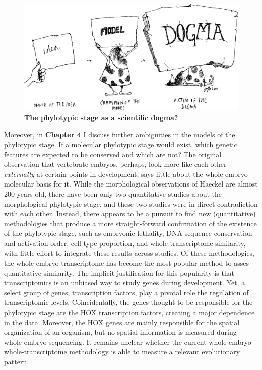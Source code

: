 \begin{figure}
    \includegraphics[width=\linewidth]{ch.discussion/imgs/dogma.png}
    \caption{\textbf{The phylotypic stage as a scientific dogma?} \cite{Caveman2000}}
    \label{fig:dogma}
\end{figure}

Moreover, in \textbf{Chapter 4} I discuss further ambiguities in the models of the phylotypic stage. If a molecular phylotypic stage would exist, which genetic features are expected to be conserved and which are not? The original observation that vertebrate embryos, perhaps, look more like each other \textit{externally} at certain points in development, says little about the whole-embryo molecular basis for it. While the morphological observations of Haeckel are almost 200 years old, there have been only two quantitative studies about the morphological phylotypic stage, and these two studies were in direct contradiction with each other. Instead, there appears to be a pursuit to find new (quantitative) methodologies that produce a more straight-forward confirmation of the existence of the phylotypic stage, such as embryonic lethality\cite{Uchida2018},  DNA sequence conservation\cite{Piasecka2013,Quint2012,Liu2021} and activation order\cite{Uesaka2019}, cell type proportion\cite{Mayshar2023}, and whole-transcriptome similarity\cite{Piasecka2013,Irie2011,marletaz2018,Liu2020,Leong2021,PerezPosada2022,Kalinka2010}, with little effort to integrate these results across studies. Of these methodologies, the whole-embryo transcriptome has become the most popular method to asses quantitative similarity. The implicit justification for this popularity is that transcriptomics is an unbiased way to study genes during development. Yet, a select group of genes, transcription factors, play a pivotal role the regulation of transcriptomic levels. Coincidentally, the genes thought to be responsible for the phylotypic stage are the HOX transcription factors\cite{Duboule1994}, creating a major dependence in the data. Moreover, the HOX genes are mainly responsible for the spatial organization of an organism, but no spatial information is measured during whole-embryo sequencing. It remains unclear whether the current whole-embryo whole-transcriptome methodology is able to measure a relevant evolutionary pattern. 

